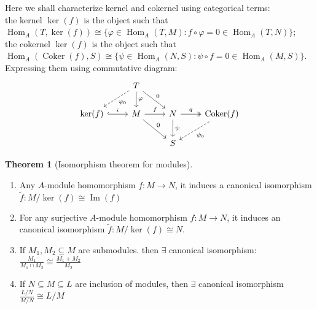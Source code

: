 \documentclass[12pt]{article}
\theoremstyle{definition}
\newtheorem{Theo}{Theorem}[section]
\theoremstyle{plain}
\DeclareMathOperator{\im}{Im}
\DeclareMathOperator{\Hom}{Hom}
\DeclareMathOperator{\Coker}{Coker}
\renewcommand{\tilde}{\widetilde}
\begin{document}
\Rmk Here we shall characterize kernel and cokernel using categorical terms:\\
     the kernel $\ker(f)$ is the object such that $\Hom_A(T, \ker(f))\cong \{\varphi\in \Hom_A(T, M):f\circ \varphi=0\in \Hom_A(T, N)\}$;\\
     the cokernel $\ker(f)$ is the object such that $\Hom_A(\Coker(f), S)\cong \{\psi\in \Hom_A(N, S): \psi\circ f=0\in \Hom_A(M, S)\}$.
     Expressing them using commutative diagram:
     \begin{equation}
       \begin{tikzcd}
         &T\ar[dashed]{ld}{\varphi_0} \ar{d}{\varphi} \ar{rd}{0}\\
         \ker(f)\ar[hook]{r}{i} &M\ar{r}{f}\ar{rd}{0} &N \ar{d}{\psi}\ar[two heads]{r}{q} &\Coker(f)\ar[dashed]{ld}{\psi_0}\\
         & & S
       \end{tikzcd}
     \end{equation}
\begin{Theo}
  [Isomorphism theorem for modules] \leavevmode
  \begin{enumerate}
    \item Any $A$-module homomorphism $f: M\to N$, it induces a canonical isomorphism $\tilde{f}: M/\ker(f)\cong \im(f)$
    \item For any surjective $A$-module homomorphism $f:M\to N$, it induces an canonical isomorphism $\tilde{f}:M/\ker(f)\cong N$.
    \item If $M_1, M_2\subseteq M$ are submodules. then $\exists $ canonical isomorphism: $\frac{M_1}{M_1\cap M_2}\cong \frac{M_1+M_2}{M_2}$
    \item If $N\subseteq M\subseteq L$ are inclusion of modules, then $\exists $ canonical isomorphism $\frac{L/N}{M/N}\cong L/M$
  \end{enumerate}
\end{Theo}

\bigskip
\end{document}
